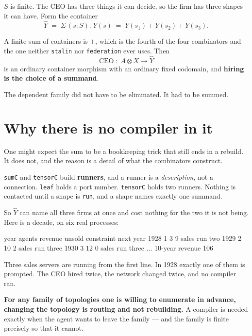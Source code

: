 \documentclass[11pt,a4paper]{article}
\begin{document}
$S$ is finite. The CEO has three things it can decide, so the firm has three
shapes it can have. Form the container
\[
  \hat{Y} \;=\; \Sigma\,(s : S).\; Y(s) \;=\; Y(s_1) + Y(s_2) + Y(s_3).
\]

A finite sum of containers is $+$, which is the fourth of the four combinators
and the one neither \texttt{stalin} nor \texttt{federation} ever uses. Then
\[
  \mathrm{CEO} \;:\; A \otimes X \longrightarrow \hat{Y}
\]
is an ordinary container morphism with an ordinary fixed codomain, and
\textbf{hiring is the choice of a summand}.

The dependent family did not have to be eliminated. It had to be summed.

\section{Why there is no compiler in it}

One might expect the sum to be a bookkeeping trick that still ends in a rebuild.
It does not, and the reason is a detail of what the combinators construct.

\begin{notebox}
\texttt{sumC} and \texttt{tensorC} build \textbf{runners}, and a runner is a
\emph{description}, not a connection. \texttt{leaf} holds a port number.
\texttt{tensorC} holds two runners. Nothing is contacted until a shape is
\texttt{run}, and a shape names exactly one summand.
\end{notebox}

So $\hat{Y}$ can name all three firms at once and cost nothing for the two it is
not being. Here is a decade, on six real processes:

\begin{term}
  year  agents  revenue  unsold  constraint   next year
  1928      1        3       9       sales      run two
  1929      2       10       2       sales      run three
  1930      3       12       0       sales      run three
  ...
  10-year revenue 106
\end{term}

Three sales servers are running from the first line. In 1928 exactly one of them
is prompted. The CEO hired twice, the network changed twice, and no compiler ran.

\begin{sectionbox}
\textbf{For any family of topologies one is willing to enumerate in advance,
changing the topology is routing and not rebuilding.} A compiler is needed
exactly when the agent wants to leave the family --- and the family is finite
precisely so that it cannot.
\end{sectionbox}
\end{document}

